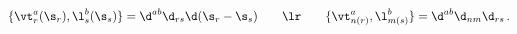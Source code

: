 \begin{equation}
\{\vt^a_r(\s_r),\l^b_s(\s_s)\}=\d^{ab}\d_{rs}\d(\s_r-\s_s)\qquad\lr\qquad\{\vt^a_{n(r)},\l^b_{m(s)}\}=\d^{ab}\d_{nm}\d_{rs}\,.
\end{equation}

